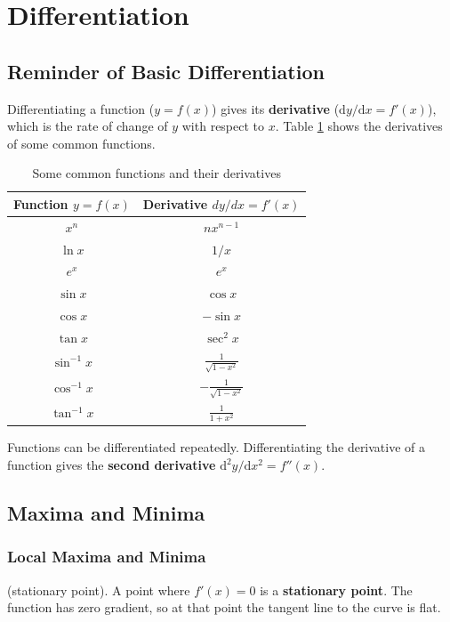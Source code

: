\section{Differentiation}

\subsection{Reminder of Basic Differentiation}

Differentiating a function ($y = f(x)$) gives its \textbf{derivative} ($\mathrm{d}y/\mathrm{d}x = f'(x)$), which is the rate of change of $y$ with respect to $x$. Table \ref{tab:derivatives} shows the derivatives of some common functions.

\begin{table}[ht]
    \centering
    \begin{tabular}{|c|c|} \hline
    Function $y = f(x)$ & Derivative $dy/dx = f'(x)$ \\ \hline
    $x^n$ & $nx^{n-1}$\\
    $\ln x$ & $1/x$\\
    $e^x$ & $e^x$\\
    $\sin x$ & $\cos x$\\
    $\cos x$ & $-\sin x$\\
    $\tan x$ & $\sec^2 x$\\
    $\sin^{-1} x$ & $\frac{1}{\sqrt{1-x^2}}$\\
    $\cos^{-1} x$ & $-\frac{1}{\sqrt{1-x^2}}$\\
    $\tan^{-1} x$ & $\frac{1}{1+x^2}$\\\hline
    \end{tabular}
    \caption{Some common functions and their derivatives}
    \label{tab:derivatives}
\end{table}

Functions can be differentiated repeatedly. Differentiating the derivative of a function gives the \textbf{second derivative} $\mathrm{d}^2y/\mathrm{d}x^2 = f''(x)$.

\newpage
\subsection{Maxima and Minima}

\subsubsection{Local Maxima and Minima}

\begin{definition}
    (stationary point). A point where $f'(x) = 0$ is a \textbf{stationary point}. The function has zero gradient, so at that point the tangent line to the curve is flat.
\end{definition}

